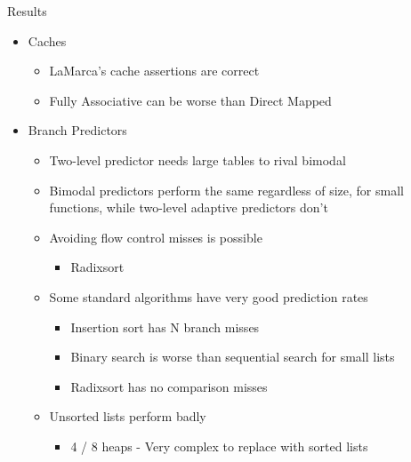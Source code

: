 \begin{slide}
\begin{stitle}
Results
\end{stitle}

\begin{itemize}
\item Caches
	\begin{itemize}
	\item LaMarca's cache assertions are correct
	\pagebreak
	\pagebreak
	\item Fully Associative can be worse than Direct Mapped
	\pagebreak
	\end{itemize}
\item Branch Predictors
	\begin{itemize}
	\item Two-level predictor needs large tables to rival bimodal
	\pagebreak
	\item Bimodal predictors perform the same regardless of size, for small functions, while two-level adaptive predictors don't
	\pagebreak
	\item Avoiding flow control misses is possible
		\begin{itemize}
		\item Radixsort
		\pagebreak
		\end{itemize}
	\item Some standard algorithms have very good prediction rates
		\begin{itemize}
		\item Insertion sort has N branch misses
		\pagebreak
		\item Binary search is worse than sequential search for small lists
		\pagebreak
		\item Radixsort has no comparison misses
		\pagebreak
		\end{itemize}
	\item Unsorted lists perform badly
		\begin{itemize}
		\item 4 / 8 heaps - Very complex to replace with sorted lists
		\pagebreak
		\end{itemize}
	\end{itemize}
\end{itemize}



\end{slide}
